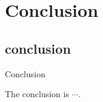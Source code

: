 \section{Conclusion}\label{sec:conclusion}

\subsection{conclusion}\label{subsec:conclusion}

\begin{frame}{Conclusion}

    The conclusion is $\cdots$.

\end{frame}
